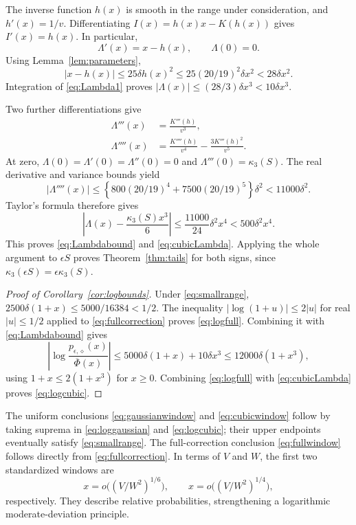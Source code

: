 \documentclass[11pt]{article}
\numberwithin{equation}{section}
\theoremstyle{remark}
\newcommand{\Phibar}{\overline\Phi}
\begin{document}
The inverse function $h(x)$ is smooth in the range under consideration,
and $h'(x)=1/v$. Differentiating
$I(x)=h(x)x-K(h(x))$ gives $I'(x)=h(x)$. In particular,
\begin{equation}\label{eq:Lambda1}
 \Lambda'(x)=x-h(x),\qquad \Lambda(0)=0.
\end{equation}
Using Lemma~\ref{lem:parameters},
\[
 |x-h(x)|\le25\delta h(x)^2
 \le25(20/19)^2\delta x^2<28\delta x^2.
\]
Integration of \eqref{eq:Lambda1} proves
$|\Lambda(x)|\le(28/3)\delta x^3<10\delta x^3$.

Two further differentiations give
\begin{align}
 \Lambda'''(x)&=\frac{K'''(h)}{v^3},
 \label{eq:Lambda3}\\
 \Lambda''''(x)&=\frac{K''''(h)}{v^4}
                    -\frac{3K'''(h)^2}{v^5}.
 \label{eq:Lambda4}
\end{align}
At zero, $\Lambda(0)=\Lambda'(0)=\Lambda''(0)=0$ and
$\Lambda'''(0)=\kappa_3(S)$. The real derivative and variance bounds yield
\[
 |\Lambda''''(x)|
 \le\left\{800(20/19)^4+7500(20/19)^5\right\}\delta^2
 <11000\delta^2.
\]
Taylor's formula therefore gives
\[
 \left|\Lambda(x)-\frac{\kappa_3(S)x^3}{6}\right|
 \le\frac{11000}{24}\delta^2x^4<500\delta^2x^4.
\]
This proves \eqref{eq:Lambdabound} and \eqref{eq:cubicLambda}. Applying the
whole argument to $\epsilon S$ proves Theorem~\ref{thm:tails} for both
signs, since $\kappa_3(\epsilon S)=\epsilon\kappa_3(S)$.

\begin{proof}[Proof of Corollary~\ref{cor:logbounds}]
Under \eqref{eq:smallrange},
$2500\delta(1+x)\le5000/16384<1/2$. The inequality
$|\log(1+u)|\le2|u|$ for real $|u|\le1/2$ applied to
\eqref{eq:fullcorrection} proves \eqref{eq:logfull}. Combining it with
\eqref{eq:Lambdabound} gives
\[
 \left|\log\frac{p_{\epsilon,\diamond}(x)}{\Phibar(x)}\right|
 \le5000\delta(1+x)+10\delta x^3
 \le12000\delta(1+x^3),
\]
using $1+x\le2(1+x^3)$ for $x\ge0$. Combining
\eqref{eq:logfull} with \eqref{eq:cubicLambda} proves
\eqref{eq:logcubic}.
\end{proof}

The uniform conclusions \eqref{eq:gaussianwindow} and
\eqref{eq:cubicwindow} follow by taking suprema in
\eqref{eq:loggaussian} and \eqref{eq:logcubic}; their upper endpoints
eventually satisfy \eqref{eq:smallrange}. The full-correction conclusion
\eqref{eq:fullwindow} follows directly from \eqref{eq:fullcorrection}.
In terms of $V$ and $W$, the first two standardized windows are
\[
 x=o\bigl((V/W^2)^{1/6}\bigr),\qquad
 x=o\bigl((V/W^2)^{1/4}\bigr),
\]
respectively. They describe relative probabilities, strengthening a
logarithmic moderate-deviation principle.
\end{document}
